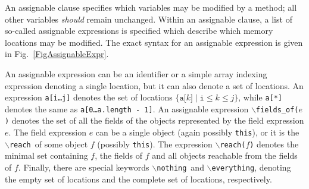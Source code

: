 \documentclass[a4paper]{llncs}
\newcommand{\jml}{\textsc{Jml}}
\newcommand{\java}{\textsc{Java}}
\newcommand{\fieldsofarg}[1]{\texttt{\(\backslash\)fields\_of(#1)}}
\newcommand{\reach}{\texttt{\(\backslash\)reach}}
\newcommand{\reacharg}[1]{\texttt{\(\backslash\)reach(#1)}}
\newcommand{\nothing}{\texttt{\(\backslash\)nothing}}
\newcommand{\everything}{\texttt{\(\backslash\)everything}}
\begin{document}
An assignable clause specifies which variables may 
be modified by a method; all other variables \emph{should} remain
unchanged. Within an assignable clause, a list of so-called assignable 
expressions is specified which describe which memory locations may be
modified. The exact syntax for an assignable
expression is given in Fig.~\ref{FigAssignableExpr}.


An assignable expression can be an identifier or a simple array
indexing expression denoting a single location, but it can also denote
a set of locations. An expression
\texttt{a[i\dots j]} denotes the set of locations
\(\{\texttt{a[}k\texttt{]}\mid \texttt{i} \leq k \leq j\}\), while
\texttt{a[*]} denotes the same as \texttt{a[0\dots a.length - 1]}.
An assignable expression \fieldsofarg{\(e\)} denotes the set of all
the fields of the objects represented by the field expression \(e\).
The field expression \(e\) can be a single object (again possibly
\texttt{this}), or it is the \reach\ of some object \(f\) (possibly
\texttt{this}). The expression \reacharg{\(f\)} denotes the minimal 
set containing \(f\), the fields of \(f\) and all objects reachable
from the fields of \(f\).  Finally, there are special keywords
\nothing\ and \everything, denoting the empty set of locations and the 
complete set of locations, respectively.

\end{document}
